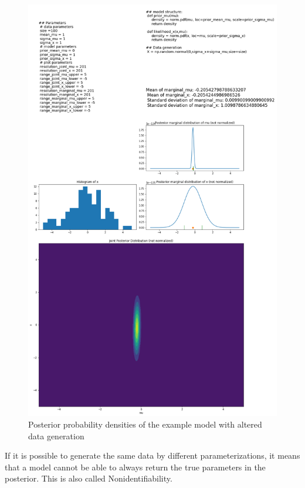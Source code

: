 \documentclass{article}
\begin{document}
\begin{figure}
	\includegraphics[width=\textwidth]{images/ground_truth_posterior_6.png}
	\caption[Posterior probability densities of the example model with altered data generation]{Posterior probability densities of the example model with altered data generation}
	\label{fig:ground_truth_posterior_6}
\end{figure}
If it is possible to generate the same data by different parameterizations, it means that a model cannot be able to always return the true parameters in the posterior. This is also called Nonidentifiability.
\end{document}
